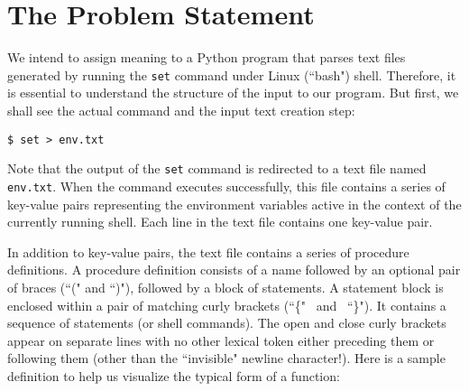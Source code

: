 \documentclass[10pt, a4paper]{article}
\begin{document}


\section{The Problem Statement}
We intend to assign meaning to a Python program that parses text files generated by running the \texttt{set} command under Linux (``bash") shell. Therefore, it is essential to understand the structure of the input to our program. But first, we shall see the actual command and the input text creation step:
{
\begin{lstlisting}
$ set > env.txt
\end{lstlisting}}

\noindent Note that the output of the \texttt{set} command is redirected to a text file named \texttt{env.txt}. When the command executes successfully, this file contains a series of key-value pairs representing the environment variables active in the context of the currently running shell. Each line in the text file contains one key-value pair. 

In addition to key-value pairs, the text file contains a series of procedure definitions. A procedure definition consists of a name followed by an optional pair of braces (``(" and ``)"), followed by a block of statements. A statement block is enclosed within a pair of matching curly brackets (``\{" \ and \ ``\}"). It contains a sequence of statements (or shell commands). The open and close curly brackets appear on separate lines with no other lexical token either preceding them or following them (other than the ``invisible" newline character!). Here is a sample definition to help us visualize the typical form of a function:
\end{document}
